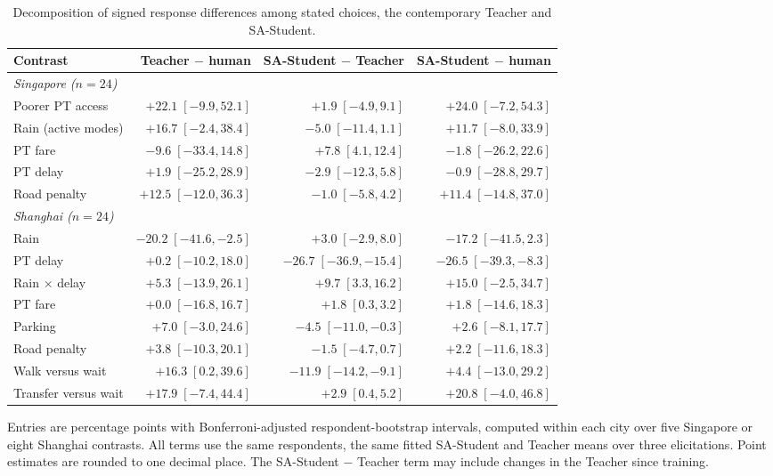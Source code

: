 \begin{table}[pos=H]
\centering\small
\caption{Decomposition of signed response differences among stated choices, the contemporary Teacher and SA-Student.}
\label{tab:teacher_decomposition_s9}
\setlength{\tabcolsep}{3pt}
\renewcommand{\arraystretch}{1.12}
\begin{tabular*}{\linewidth}{@{\extracolsep{\fill}}lrrr@{}}
\toprule
Contrast & Teacher $-$ human & SA-Student $-$ Teacher & SA-Student $-$ human \\
\midrule
\multicolumn{4}{l}{\textit{Singapore ($n=24$)}} \\
Poorer PT access & $+22.1\;[-9.9, 52.1]$ & $+1.9\;[-4.9, 9.1]$ & $+24.0\;[-7.2, 54.3]$ \\
Rain (active modes) & $+16.7\;[-2.4, 38.4]$ & $-5.0\;[-11.4, 1.1]$ & $+11.7\;[-8.0, 33.9]$ \\
PT fare & $-9.6\;[-33.4, 14.8]$ & $+7.8\;[4.1, 12.4]$ & $-1.8\;[-26.2, 22.6]$ \\
PT delay & $+1.9\;[-25.2, 28.9]$ & $-2.9\;[-12.3, 5.8]$ & $-0.9\;[-28.8, 29.7]$ \\
Road penalty & $+12.5\;[-12.0, 36.3]$ & $-1.0\;[-5.8, 4.2]$ & $+11.4\;[-14.8, 37.0]$ \\
\midrule
\multicolumn{4}{l}{\textit{Shanghai ($n=24$)}} \\
Rain & $-20.2\;[-41.6, -2.5]$ & $+3.0\;[-2.9, 8.0]$ & $-17.2\;[-41.5, 2.3]$ \\
PT delay & $+0.2\;[-10.2, 18.0]$ & $-26.7\;[-36.9, -15.4]$ & $-26.5\;[-39.3, -8.3]$ \\
Rain $\times$ delay & $+5.3\;[-13.9, 26.1]$ & $+9.7\;[3.3, 16.2]$ & $+15.0\;[-2.5, 34.7]$ \\
PT fare & $+0.0\;[-16.8, 16.7]$ & $+1.8\;[0.3, 3.2]$ & $+1.8\;[-14.6, 18.3]$ \\
Parking & $+7.0\;[-3.0, 24.6]$ & $-4.5\;[-11.0, -0.3]$ & $+2.6\;[-8.1, 17.7]$ \\
Road penalty & $+3.8\;[-10.3, 20.1]$ & $-1.5\;[-4.7, 0.7]$ & $+2.2\;[-11.6, 18.3]$ \\
Walk versus wait & $+16.3\;[0.2, 39.6]$ & $-11.9\;[-14.2, -9.1]$ & $+4.4\;[-13.0, 29.2]$ \\
Transfer versus wait & $+17.9\;[-7.4, 44.4]$ & $+2.9\;[0.4, 5.2]$ & $+20.8\;[-4.0, 46.8]$ \\
\bottomrule
\end{tabular*}
\par\smallskip\begin{minipage}{\linewidth}\footnotesize
Entries are percentage points with Bonferroni-adjusted respondent-bootstrap intervals, computed within each city over five Singapore or eight Shanghai contrasts. All terms use the same respondents, the same fitted SA-Student and Teacher means over three elicitations. Point estimates are rounded to one decimal place. The SA-Student $-$ Teacher term may include changes in the Teacher since training.
\end{minipage}
\end{table}

